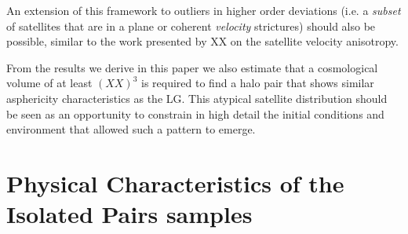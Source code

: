 \documentclass[a4paper,fleqn,usenatbib]{mnras}
\begin{document}
An extension of this framework to outliers in higher order deviations
(i.e. a \emph{subset} of satellites that are in a plane or
coherent \emph{velocity} strictures) should also be possible, similar
to the work presented by XX on the satellite velocity anisotropy.

From the results we derive in this paper we also estimate that a
cosmological volume of at least $( XX )^3$ is required to find a halo pair
that shows similar asphericity characteristics as the LG. 
This atypical satellite distribution should be seen as an opportunity
to constrain in high detail the initial conditions and environment
that allowed such a pattern to emerge. 










\appendix

\section{Physical Characteristics of the Isolated Pairs samples}
\end{document}
